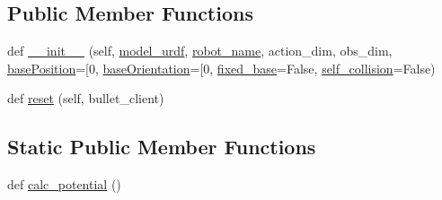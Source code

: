 \subsection*{Public Member Functions}
\begin{DoxyCompactItemize}
\item 
def \hyperlink{classpybullet-gym_1_1pybulletgym_1_1envs_1_1roboschool_1_1robots_1_1robot__bases_1_1_u_r_d_f_based_robot_a6c1b5548e1649ce3247bcdec4748d1ef}{\+\_\+\+\_\+init\+\_\+\+\_\+} (self, \hyperlink{classpybullet-gym_1_1pybulletgym_1_1envs_1_1roboschool_1_1robots_1_1robot__bases_1_1_u_r_d_f_based_robot_a0a5b68545bb8f649088762d74c7af1d9}{model\+\_\+urdf}, \hyperlink{classpybullet-gym_1_1pybulletgym_1_1envs_1_1roboschool_1_1robots_1_1robot__bases_1_1_xml_based_robot_a27a9dfbfbfd4f3478cc4ea4ace80af97}{robot\+\_\+name}, action\+\_\+dim, obs\+\_\+dim, \hyperlink{classpybullet-gym_1_1pybulletgym_1_1envs_1_1roboschool_1_1robots_1_1robot__bases_1_1_u_r_d_f_based_robot_a15f69719168ce7efa995870f562aa81e}{base\+Position}=\mbox{[}0, \hyperlink{classpybullet-gym_1_1pybulletgym_1_1envs_1_1roboschool_1_1robots_1_1robot__bases_1_1_u_r_d_f_based_robot_ade8d84f5249fc79a1b16607fb73a731d}{base\+Orientation}=\mbox{[}0, \hyperlink{classpybullet-gym_1_1pybulletgym_1_1envs_1_1roboschool_1_1robots_1_1robot__bases_1_1_u_r_d_f_based_robot_a7e3d2492e0247f2ee35e545d3f2c4da3}{fixed\+\_\+base}=False, \hyperlink{classpybullet-gym_1_1pybulletgym_1_1envs_1_1roboschool_1_1robots_1_1robot__bases_1_1_xml_based_robot_ab6ba95cc9efcb674bb70711d09755b02}{self\+\_\+collision}=False)
\item 
def \hyperlink{classpybullet-gym_1_1pybulletgym_1_1envs_1_1roboschool_1_1robots_1_1robot__bases_1_1_u_r_d_f_based_robot_a3f59401f3965bf0096d94fb1d82d73e2}{reset} (self, bullet\+\_\+client)
\end{DoxyCompactItemize}
\subsection*{Static Public Member Functions}
\begin{DoxyCompactItemize}
\item 
def \hyperlink{classpybullet-gym_1_1pybulletgym_1_1envs_1_1roboschool_1_1robots_1_1robot__bases_1_1_u_r_d_f_based_robot_a9c68554663eca31aa435844d01f30079}{calc\+\_\+potential} ()
\end{DoxyCompactItemize}
